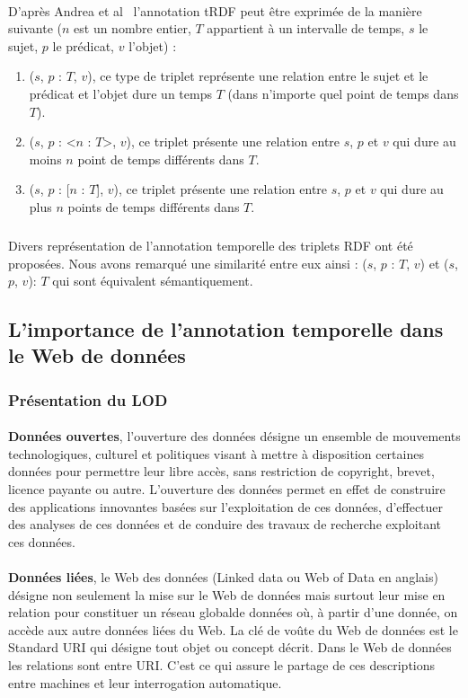 \documentclass[12pt,a4]{report}
\begin{document}
\paragraph{}
D'après Andrea et al~\cite{pugliese2008} l’annotation tRDF peut être exprimée de la manière suivante ($n$ est un nombre entier, $T$ appartient à un intervalle de temps, $s$ le sujet, $p$ le prédicat, $v$ l'objet) :
\begin{enumerate}
\item ($s$, $p$ : {$T$}, $v$), ce type de triplet représente une relation entre le sujet et le prédicat et l'objet dure un temps $T$ (dans n'importe quel point de temps dans $T$).
\item ($s$, $p$ : <$n$ : $T$>, $v$), ce triplet présente une relation entre $s$, $p$ et $v$ qui dure au moins $n$ point de temps différents dans $T$.
\item ($s$, $p$ : [$n$ : $T$], $v$), ce triplet présente une relation entre $s$, $p$ et $v$ qui dure au plus $n$ points de temps différents dans $T$.
\end{enumerate}
\subparagraph{}
Divers représentation de l'annotation temporelle des triplets RDF ont été proposées. Nous avons remarqué une similarité entre eux ainsi : ($s$, $p$ : {$T$}, $v$) et ($s$, $p$, $v$): $T$ qui sont équivalent sémantiquement.	
\subsection{L'importance de l'annotation temporelle dans le Web de données}
\subsubsection{Présentation du LOD}
\paragraph{}
{\bf Données ouvertes}, l'ouverture des données désigne un ensemble de mouvements technologiques, culturel et politiques visant à mettre à disposition certaines données pour permettre leur libre accès, sans restriction de copyright, brevet, licence payante ou autre.
L'ouverture des données permet en effet de construire des applications innovantes basées sur l'exploitation de ces données, d'effectuer des analyses de ces données et de conduire des travaux de recherche exploitant ces données.
\paragraph{}
{\bf Données liées}, le Web des données (Linked data ou Web of Data en anglais) désigne non seulement la mise sur le Web de données mais surtout leur mise en relation pour constituer un réseau globalde données où, à partir d'une donnée, on accède aux autre données liées du Web. La clé de voûte du Web de données est le Standard URI qui désigne tout objet ou concept décrit. Dans le Web de données les relations sont entre URI. C'est ce qui assure le partage de ces descriptions entre machines et leur interrogation automatique.
\end{document}
